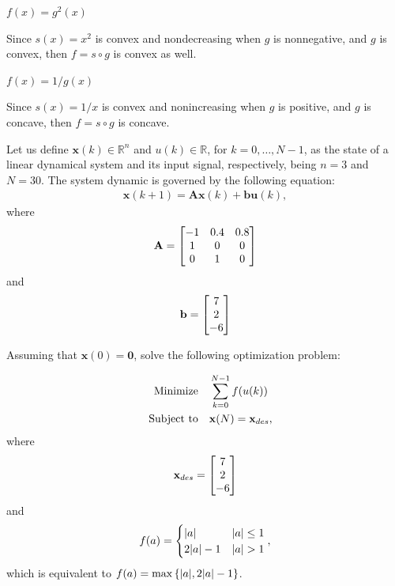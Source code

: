 \documentclass[12pt,a4paper]{article}
\begin{document}
\subproblem \(f(x) = g^2(x)\)

Since \(s(x) = x^2\) is convex and nondecreasing when \(g\) is nonnegative, and \(g\) is convex, then \(f = s \circ g\) is convex as well.

\subproblem \(f(x) = 1/g(x)\)

Since \(s(x) = 1/x\) is convex and nonincreasing when \(g\) is positive, and \(g\) is concave, then \(f = s \circ g\) is concave.

\problem

Let us define \(\mathbf{x}(k) \in \mathbb{R}^{n}\) and \(u(k) \in \mathbb{R}\), for \(k = 0, \dots, N-1\), as the state of a linear dynamical system and its input signal, respectively, being \(n = 3\) and \(N = 30\). The system dynamic is governed by the following equation:
\begin{align}
    \mathbf{x}(k+1) = \mathbf{A} \mathbf{x}(k) + \mathbf{b} \mathbf{u}(k),
\end{align}
where
\begin{align}
    \mathbf{A} = \bmqty{-1 & 0.4 & 0.8\\
           1 & 0 & 0\\
           0 & 1 & 0}
\end{align}
and
\begin{align}
    \mathbf{b} = \mqty[7\\2\\-6]
\end{align}

Assuming that \(\mathbf{x}(0) = \mathbf{0}\), solve the following optimization problem:

\begin{align}
    \qq{Minimize} & \sum_{k = 0}^{N-1} f(u(k))\\
    \qq{Subject to} & \mathbf{x}(N) = \mathbf{x}_{des},
\end{align}
where
\begin{align}
    \mathbf{x}_{des} = \mqty[7\\2\\-6]
\end{align}
and
\begin{align}
    f(a) = \begin{cases}
        \abs{a} & \abs{a} \leq 1 \\
        2\abs{a} - 1 & \abs{a} > 1
    \end{cases},
\end{align}
which is equivalent to \(f(a) = \max{\left\{ \abs{a}, 2\abs{a} - 1 \right\}}\).
\end{document}
